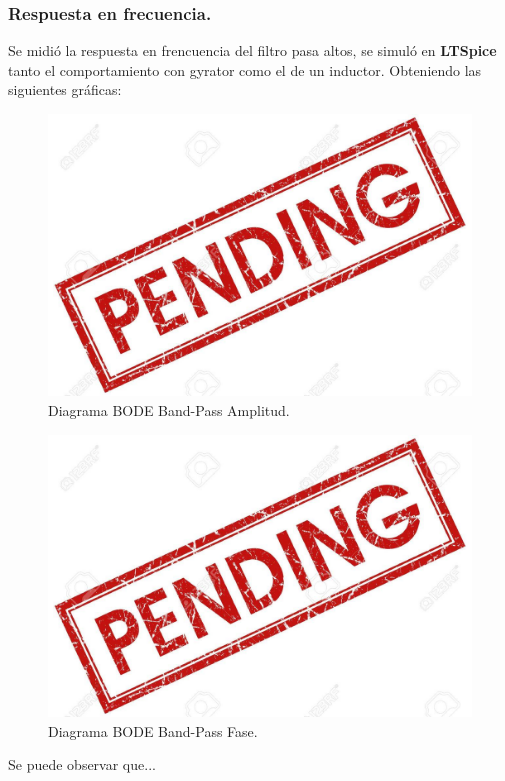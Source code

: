 \documentclass[a4paper]{article}
\begin{document}
\subsubsection{Respuesta en frecuencia.}
Se midió la respuesta en frencuencia del filtro pasa altos, se simuló en \textbf{LTSpice}  tanto el comportamiento con gyrator como el de un inductor. Obteniendo las siguientes gráficas:
\begin{figure}[H]	
	\centering
	\includegraphics[width=\textwidth]{ImagenesEj2/bodebp.jpg}
	\caption{Diagrama BODE Band-Pass Amplitud.}
	\label{fig:bodebp}
\end{figure}
\begin{figure}[H]	
	\centering
	\includegraphics[width=\textwidth]{ImagenesEj2/bodebpp.jpg}
	\caption{Diagrama BODE Band-Pass Fase.}
	\label{fig:bodebpp}
\end{figure}
Se puede observar que...
\end{document}
